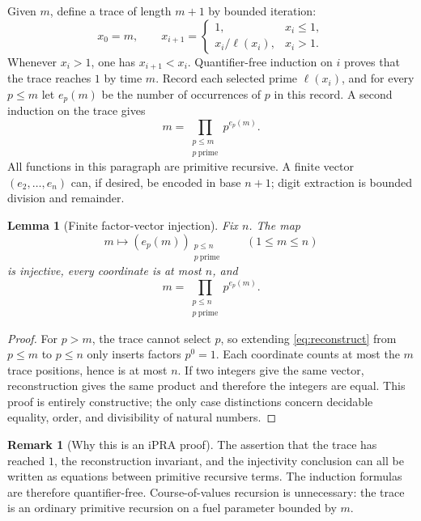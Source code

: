 \documentclass[11pt]{article}
\newtheorem{lemma}[theorem]{Lemma}
\theoremstyle{definition}
\newtheorem{remark}[theorem]{Remark}
\newcommand{\ipra}{\mathrm{iPRA}}
\begin{document}
Given \(m\), define a trace of length \(m+1\) by bounded iteration:
\[
 x_0=m,
 \qquad
 x_{i+1}=
 \begin{cases}
  1,&x_i\leq 1,\\
  x_i/\ell(x_i),&x_i>1.
 \end{cases}
\]
Whenever \(x_i>1\), one has \(x_{i+1}<x_i\).  Quantifier-free induction on
\(i\) proves that the trace reaches \(1\) by time \(m\).  Record each selected
prime \(\ell(x_i)\), and for every \(p\leq m\) let \(e_p(m)\) be the number of
occurrences of \(p\) in this record.  A second induction on the trace gives
\begin{equation}\label{eq:reconstruct}
  m=\prod_{\substack{p\leq m\\p\ \mathrm{prime}}}p^{e_p(m)}.
\end{equation}
All functions in this paragraph are primitive recursive.  A finite vector
\((e_2,\ldots,e_n)\) can, if desired, be encoded in base \(n+1\); digit
extraction is bounded division and remainder.

\begin{lemma}[Finite factor-vector injection]\label{lem:factor-injection}
Fix \(n\).  The map
\[
  m\longmapsto (e_p(m))_{\substack{p\leq n\\p\ \mathrm{prime}}}
  \qquad(1\leq m\leq n)
\]
is injective, every coordinate is at most \(n\), and
\[
  m=\prod_{\substack{p\leq n\\p\ \mathrm{prime}}}p^{e_p(m)}.
\]
\end{lemma}

\begin{proof}
For \(p>m\), the trace cannot select \(p\), so extending
\eqref{eq:reconstruct} from \(p\leq m\) to \(p\leq n\) only inserts factors
\(p^0=1\).  Each coordinate counts at most the \(m\) trace positions, hence is
at most \(n\).  If two integers give the same vector, reconstruction gives the
same product and therefore the integers are equal.  This proof is entirely
constructive; the only case distinctions concern decidable equality,
order, and divisibility of natural numbers.
\end{proof}

\begin{remark}[Why this is an \(\ipra\) proof]
The assertion that the trace has reached \(1\), the reconstruction invariant,
and the injectivity conclusion can all be written as equations between
primitive recursive terms.  The induction formulas are therefore
quantifier-free.  Course-of-values recursion is unnecessary: the trace is an
ordinary primitive recursion on a fuel parameter bounded by \(m\).
\end{remark}
\end{document}
